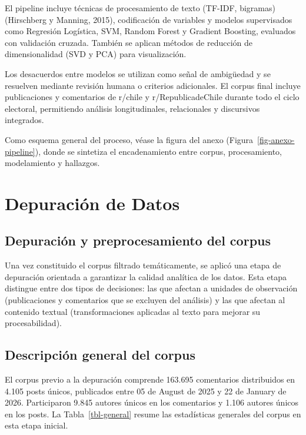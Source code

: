 \documentclass[
  letterpaper,
  numbers=noendperiod,
  fontsize=11pt,
  DIV=12,
  titlepage=false]{scrreprt}
\begin{document}
El pipeline incluye técnicas de procesamiento de texto (TF-IDF,
bigramas) (Hirschberg y Manning, 2015), codificación de variables y
modelos supervisados como Regresión Logística, SVM, Random Forest y
Gradient Boosting, evaluados con validación cruzada. También se aplican
métodos de reducción de dimensionalidad (SVD y PCA) para visualización.

Los desacuerdos entre modelos se utilizan como señal de ambigüedad y se
resuelven mediante revisión humana o criterios adicionales. El corpus
final incluye publicaciones y comentarios de r/chile y
r/RepublicadeChile durante todo el ciclo electoral, permitiendo análisis
longitudinales, relacionales y discursivos integrados.

Como esquema general del proceso, véase la figura del anexo
(Figura~\ref{fig-anexo-pipeline}), donde se sintetiza el encadenamiento
entre corpus, procesamiento, modelamiento y hallazgos.


\chapter{Depuración de Datos}\label{depuraciuxf3n-de-datos}

\section{Depuración y preprocesamiento del
corpus}\label{depuraciuxf3n-y-preprocesamiento-del-corpus}

Una vez constituido el corpus filtrado temáticamente, se aplicó una
etapa de depuración orientada a garantizar la calidad analítica de los
datos. Esta etapa distingue entre dos tipos de decisiones: las que
afectan a unidades de observación (publicaciones y comentarios que se
excluyen del análisis) y las que afectan al contenido textual
(transformaciones aplicadas al texto para mejorar su procesabilidad).

\section{Descripción general del
corpus}\label{descripciuxf3n-general-del-corpus}

El corpus previo a la depuración comprende 163.695 comentarios
distribuidos en 4.105 posts únicos, publicados entre 05 de August de
2025 y 22 de January de 2026. Participaron 9.845 autores únicos en los
comentarios y 1.106 autores únicos en los posts. La
Tabla~\ref{tbl-general} resume las estadísticas generales del corpus en
esta etapa inicial.
\end{document}
